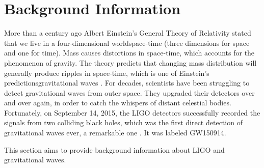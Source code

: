 \documentclass[aps,prd,preprint]{revtex4}
\begin{document}
\section{Background Information}
More than a century ago Albert Einstein's General Theory of Relativity stated that we live in a four-dimensional world\textemdash space-time (three dimensions for space and one for time). Mass causes distortions in space-time, which accounts for the phenomenon of gravity. The theory predicts that changing mass distribution will generally produce ripples in space-time, which is one of Einstein's predictions\textemdash gravitational waves \cite{relativity1,relativity2}. For decades, scientists have been struggling to detect gravitational waves from outer space. They upgraded their detectors over and over again, in order to catch the whispers of distant celestial bodies. Fortunately, on September 14, 2015, the LIGO detectors successfully recorded the signals from two colliding black holes, which was the first direct detection of gravitational waves ever, a remarkable one \cite{O1}. It was labeled GW150914.
\par This section aims to provide background information about LIGO and gravitational waves.
\end{document}
